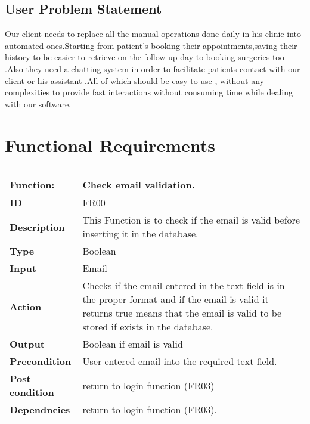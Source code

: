 \documentclass[]{article}
\begin{document}
\subsection{ User Problem Statement}
Our client needs to replace all the manual operations done daily in his clinic into automated ones.Starting from patient's booking their appointments,saving their history to be easier to retrieve on the follow up day to booking surgeries too .Also they need a chatting system in order to facilitate patients contact with our client or his assistant .All of which should be easy to use , without any complexities to provide fast interactions without consuming time while dealing with our software.

\section{Functional Requirements}

\FloatBarrier
\begin{table}[h]
\caption{ }
\label{tab:my-table}
\begin{tabular}{|p{}|p{}|}
\hline
\textbf{Function:} & Check email validation.
\\ \hline
\textbf{ID}  &      FR00      

\\ \hline
\textbf{Description}    &    This Function is to check if the email is valid before inserting it in the database.                                                                 
\\ \hline
\textbf{Type}    &         Boolean

\\ \hline
\textbf{Input}        & Email


\\ \hline
\textbf{Action}            & Checks if the email entered in the text field  is in the proper format and  if the email is valid  it returns true means that the email is valid to be stored if exists in the database.

\\ \hline
\textbf{Output}            & Boolean if email is valid

\\ \hline
\textbf{Precondition}           &   User entered email into the required text field.

\\ \hline
\textbf{Post condition}          & return to login function (FR03)  


\\ \hline
\textbf{Dependncies}           & return to login function (FR03).
\\ \hline
\end{tabular}
\end{table}
\end{document}
